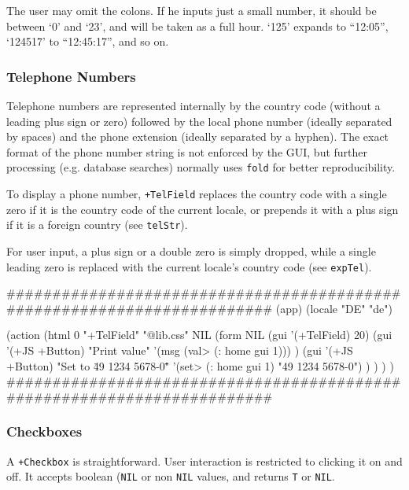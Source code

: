 The user may omit the colons. If he inputs just a small number, it
should be between `0' and `23', and will be taken as a full hour. `125'
expands to ``12:05'', `124517' to ``12:45:17'', and so on.

\subsubsection{ Telephone Numbers}
\label{sec:appl-devel-telephone-numbers}%

Telephone numbers are represented internally by the country code
(without a leading plus sign or zero) followed by the local phone number
(ideally separated by spaces) and the phone extension (ideally separated
by a hyphen). The exact format of the phone number string is not
enforced by the GUI, but further processing (e.g. database searches)
normally uses \texttt{fold} for better reproducibility.

To display a phone number, \texttt{+TelField} replaces the country code with a
single zero if it is the country code of the current locale, or prepends
it with a plus sign if it is a foreign country (see \texttt{telStr}).

For user input, a plus sign or a double zero is simply dropped, while a
single leading zero is replaced with the current locale's country code
(see \texttt{expTel}).


\begin{wideverbatim}
########################################################################
(app)
(locale "DE" "de")

(action
   (html 0 "+TelField" "@lib.css" NIL
      (form NIL
         (gui '(+TelField) 20)
         (gui '(+JS +Button) "Print value"
            '(msg (val> (: home gui 1))) )
         (gui '(+JS +Button) "Set to \"49 1234 5678-0\""
            '(set> (: home gui 1) "49 1234 5678-0") ) ) ) )
########################################################################
\end{wideverbatim}

\subsubsection{ Checkboxes}
\label{sec:appl-devel-checkboxes}%

A \texttt{+Checkbox} is straightforward. User interaction is restricted to
clicking it on and off. It accepts boolean (\texttt{NIL} or non \texttt{NIL}  values,
and returns \texttt{T} or \texttt{NIL}.


